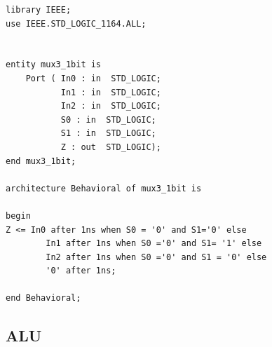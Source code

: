 \documentclass{article}
\begin{document}
\begin{lstlisting}
library IEEE;
use IEEE.STD_LOGIC_1164.ALL;


entity mux3_1bit is
    Port ( In0 : in  STD_LOGIC;
           In1 : in  STD_LOGIC;
           In2 : in  STD_LOGIC;
           S0 : in  STD_LOGIC;
           S1 : in  STD_LOGIC;
           Z : out  STD_LOGIC);
end mux3_1bit;

architecture Behavioral of mux3_1bit is

begin
Z <= In0 after 1ns when S0 = '0' and S1='0' else
		In1 after 1ns when S0 ='0' and S1= '1' else
		In2 after 1ns when S0 ='0' and S1 = '0' else
		'0' after 1ns;

end Behavioral;
\end{lstlisting}


\pagebreak


\subsection{ALU}\label{sec:result}
\end{document}
